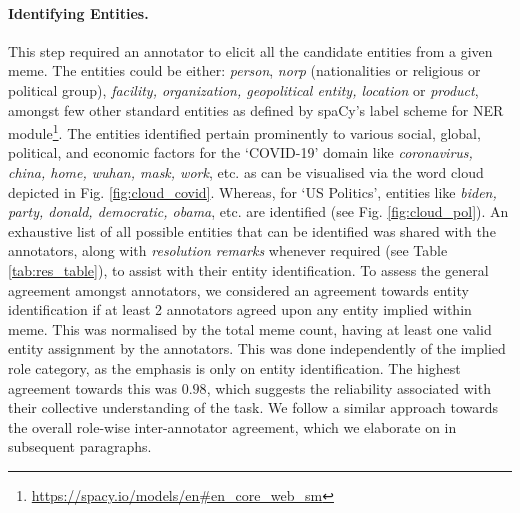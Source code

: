 \documentclass[11pt]{article}
\begin{document}

\paragraph{\bf Identifying Entities.} This step required an annotator to elicit all the candidate entities from a given meme. The entities could be either: \textit{person}, \textit{norp} (nationalities or religious or political group), \textit{facility, organization, geopolitical entity, location} or \textit{product}, amongst few other standard entities as defined by spaCy's label scheme for NER module\footnote{\url{https://spacy.io/models/en\#en_core_web_sm}}. The entities identified pertain prominently to various social, global, political, and economic factors for the `COVID-19' domain like \textit{coronavirus, china, home, wuhan, mask, work}, etc. as can be visualised via the word cloud depicted in Fig. \ref{fig:cloud_covid}. Whereas, for `US Politics', entities like \textit{biden, party, donald, democratic, obama}, etc. are identified (see Fig. \ref{fig:cloud_pol}). An exhaustive list of all possible entities that can be identified was shared with the annotators, along with \textit{resolution remarks} whenever required (see Table \ref{tab:res_table}), to assist with their entity identification. To assess the general agreement amongst annotators, we considered an agreement towards entity identification if at least 2 annotators agreed upon any entity implied within meme. This was normalised by the total meme count, having at least one valid entity assignment by the annotators. This was done independently of the implied role category, as the emphasis is only on entity identification. The highest agreement towards this was $0.98$, which suggests the reliability associated with their collective understanding of the task. We follow a similar approach towards the overall role-wise inter-annotator agreement, which we elaborate on in subsequent paragraphs. 

\end{document}
